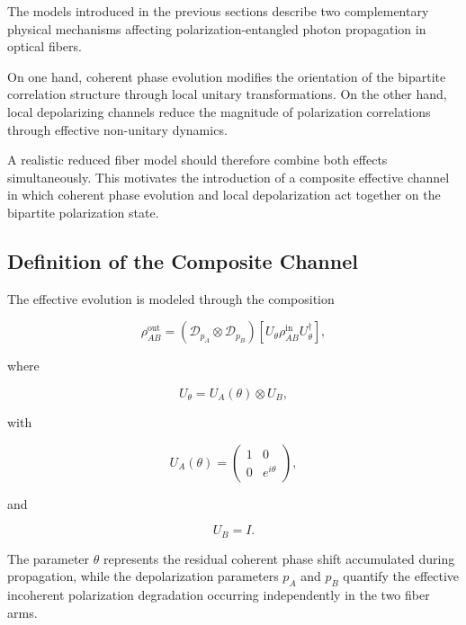 The models introduced in the previous sections describe two complementary physical mechanisms affecting polarization-entangled photon propagation in optical fibers.

\medskip

On one hand, coherent phase evolution modifies the orientation of the bipartite correlation structure through local unitary transformations. On the other hand, local depolarizing channels reduce the magnitude of polarization correlations through effective non-unitary dynamics.

\medskip

A realistic reduced fiber model should therefore combine both effects simultaneously. This motivates the introduction of a composite effective channel in which coherent phase evolution and local depolarization act together on the bipartite polarization state.

\medskip


\subsection{Definition of the Composite Channel}

The effective evolution is modeled through the composition

\begin{equation}
\rho_{AB}^{\mathrm{out}}
=
\left(
\mathcal{D}_{p_A}
\otimes
\mathcal{D}_{p_B}
\right)
\left[
U_{\theta}
\rho_{AB}^{\mathrm{in}}
U_{\theta}^{\dagger}
\right],
\label{eq:composite_fiber_channel}
\end{equation}

where

\[
U_{\theta}
=
U_A(\theta)
\otimes
U_B,
\]

with

\[
U_A(\theta)
=
\begin{pmatrix}
1 & 0 \\
0 & e^{i\theta}
\end{pmatrix},
\]

and

\[
U_B
=
I.
\]

\medskip

The parameter \( \theta \) represents the residual coherent phase shift accumulated during propagation, while the depolarization parameters \( p_A \) and \( p_B \) quantify the effective incoherent polarization degradation occurring independently in the two fiber arms.

